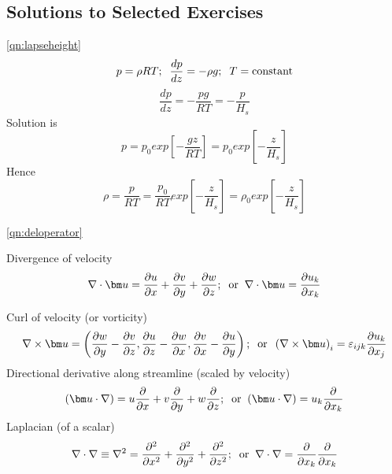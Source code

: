 \documentclass[10pt]{report}
\begin{document}



\begin{answer2}

\newpage

\section{Solutions to Selected Exercises}




\begin{questionnumber}{\ref{qn:lapseheight}}
\[
	p = \rho RT; \;\; \frac{dp}{dz} = -\rho g; \;\; T = \mbox{\rm constant}
\]
\[
	\frac{dp}{dz} = -\frac{pg}{RT} = -\frac{p}{H_{s}}
\]
Solution is
\[
	p = p_{0} exp\left[-\frac{gz}{RT}\right] = p_{0} exp\left[-\frac{z}{H_{s}}\right]
\]
Hence
\[
\rho = \frac{p}{RT} = \frac{p_{0}}{RT} exp\left[-\frac{z}{H_{s}}\right] =
                      \rho_{0} exp\left[-\frac{z}{H_{s}}\right]
\]
\end{questionnumber}

\begin{questionnumber}{\ref{qn:deloperator}}

Divergence of velocity
\[
\nabla \cdot {\bm u} = \frac{\partial u}{\partial x} +
                       \frac{\partial v}{\partial y} +
                       \frac{\partial w}{\partial z}; \;\; \mbox{\rm or} \;\;
\nabla \cdot {\bm u} = \frac{\partial u_{k}}{\partial x_{k}}
\]

Curl of velocity (or vorticity)
\[
\nabla \times {\bm u} =
               \left( \frac{\partial w}{\partial y} -  \frac{\partial v}{\partial z},
                      \frac{\partial u}{\partial z} -  \frac{\partial w}{\partial x},
                      \frac{\partial v}{\partial x} -  \frac{\partial u}{\partial y} \right); \;\; \mbox{\rm or} \;\;
\left( \nabla \times {\bm u} \right)_{i} = \varepsilon_{ijk}\frac{\partial u_{k}}{\partial x_{j}}
\]
Directional derivative along streamline (scaled by velocity)
\[
({\bm u}\cdot \nabla) =
        u\frac{\partial}{\partial x} + v \frac{\partial}{\partial y} + w\frac{\partial}{\partial z} ; \;\; \mbox{\rm or} \;\;
({\bm u}\cdot \nabla) = u_{k}\frac{\partial}{\partial x_{k}}
\]
Laplacian (of a scalar)
\[
    \nabla \cdot \nabla \equiv \nabla^{2} =
 				\frac{\partial^{2}}{\partial x^{2}} +
				 \frac{\partial^{2}}{\partial y^{2}} +
				  \frac{\partial^{2}}{\partial z^{2}}  ; \;\; \mbox{\rm or} \;\;
    \nabla \cdot \nabla = \frac{\partial}{\partial x_{k}}\frac{\partial}{\partial x_{k}}
\]


\end{questionnumber}
\end{answer2}
\end{document}
